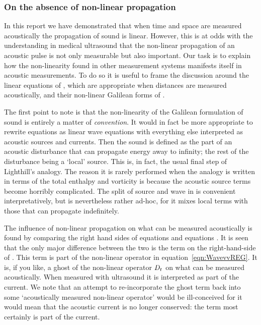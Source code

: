 \subsubsection{On the absence of non-linear propagation} \label{sec:NonlinearProp}

In this report we have demonstrated that when time and space are measured acoustically
the propagation of sound is linear.
However, this is at odds with the  understanding in medical ultrasound that the non-linear propagation of an acoustic pulse
is not only measurable but also important.
Our task is to explain how the non-linearity found in other measurement systems  manifests itself in acoustic measurements.
To do so it is useful to frame the discussion around the linear equations of
,
 which are appropriate when distances are measured acoustically,
and their non-linear Galilean forms of .

The first point to note is that the non-linearity of the Galilean formulation of sound is entirely a matter of {\em  convention}.
It would in fact be more appropriate to rewrite equations  as linear wave equations with everything else interpreted as acoustic sources and currents.
Then the sound is defined as the part of an acoustic disturbance that can propagate energy away to infinity;
the rest of the disturbance being a `local' source.
This is, in fact, the usual final step of Lighthill's analogy.
The reason it is rarely performed when the analogy is written in terms of the total enthalpy and vorticity is because
the acoustic source terms become horribly complicated.
The split of source and wave in  is convenient  interpretatively, but is nevertheless rather ad-hoc,
for it mixes local terms with those that can propagate indefinitely.

The influence of non-linear propagation on what can be measured acoustically is found by comparing the right hand sides of equations  and equations .
It is seen that the only major difference between the two is the term 
 on the right-hand-side of .
This term is part of the non-linear operator in equation~\ref{eqn:WavevvREG}.
It is, if you like, a ghost of the non-linear operator $D_t$ on what can be measured acoustically.
When measured with ultrasound it is interpreted  as part of the current.
We note that an attempt to re-incorporate the ghost  term back into some `acoustically measured non-linear operator' would be ill-conceived 
for it would mean that the acoustic current is no longer conserved:
the term %
most certainly is part of the current.




